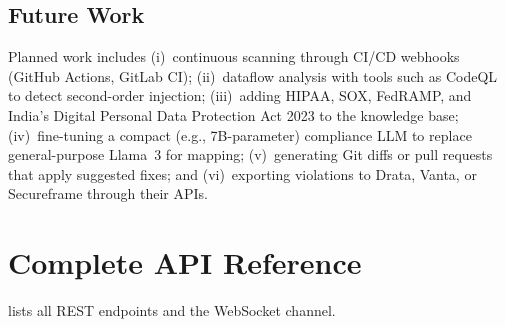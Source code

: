 \documentclass[conference]{IEEEtran}
\begin{document}
\subsection{Future Work}
Planned work includes (i)~continuous scanning through CI/CD webhooks (GitHub
Actions, GitLab CI); (ii)~dataflow analysis with tools such as CodeQL to detect
second-order injection; (iii)~adding HIPAA, SOX, FedRAMP, and India's Digital
Personal Data Protection Act 2023 to the knowledge base; (iv)~fine-tuning a
compact (e.g., 7B-parameter) compliance LLM to replace general-purpose Llama~3
for mapping; (v)~generating Git diffs or pull requests that apply suggested
fixes; and (vi)~exporting violations to Drata, Vanta, or Secureframe through
their APIs.

\appendices

\section{Complete API Reference}
\label{app:api}
 lists all REST endpoints and the WebSocket channel.
\end{document}
